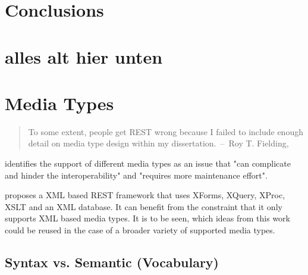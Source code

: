 \documentclass[12pt,a4paper,twoside]{scrartcl}		%
\begin{document}
\section{Conclusions}
\label{sec:conclusions}



\section{alles alt hier unten}





\section{Media Types}


\begin{quote}
  To some extent, people get REST wrong because I failed to include enough
  detail on media type design within my dissertation.~--~Roy T. Fielding, \cite{Fielding2008}
\end{quote}

\cite[sec. 7.2]{Pautasso:2008:RWS:1367497.1367606} identifies the support of different media types as an issue that "can complicate and hinder the interoperability" and "requires more maintenance effort".

\cite{Davis:2011:XTR:1967428.1967437} proposes a XML based REST framework that uses XForms, XQuery, XProc, XSLT and an XML database. It can benefit from the constraint that it only supports XML based media types. It is to be seen, which ideas from this work could be reused in the case of a broader variety of supported media types.

\subsection{Syntax vs. Semantic (Vocabulary)}
\end{document}
